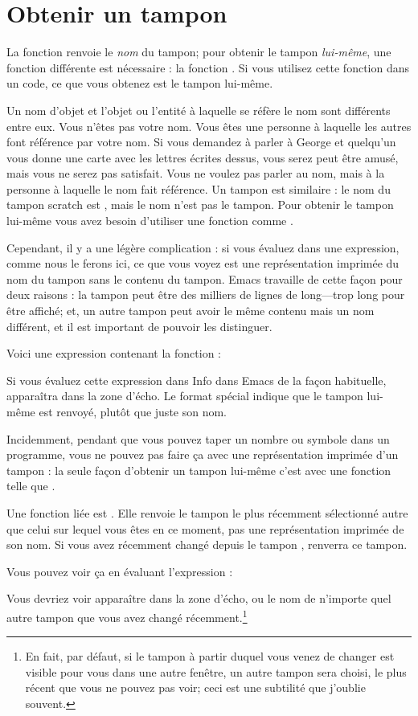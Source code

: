 \section{Obtenir un tampon}

La fonction  renvoie le \textit{nom} du tampon; pour
obtenir le tampon \textit{lui-même}, une fonction différente est
nécessaire : la fonction . Si vous utilisez cette
fonction dans un code, ce que vous obtenez est le tampon lui-même.

Un nom d'objet et l'objet ou l'entité à laquelle se réfère le nom sont
différents entre eux. Vous n'êtes pas votre nom. Vous êtes une
personne à laquelle les autres font référence par votre nom. Si vous
demandez à parler à George et quelqu'un vous donne une carte avec les
lettres  écrites dessus, vous serez
peut être amusé, mais vous ne serez pas satisfait. Vous ne voulez pas
parler au nom, mais à la personne à laquelle le nom fait
référence. Un tampon est similaire : le nom du tampon scratch est
, mais le nom n'est pas le tampon. Pour obtenir le
tampon lui-même vous avez besoin d'utiliser une fonction comme
.

Cependant, il y a une légère complication : si vous évaluez
 dans une expression, comme nous le ferons ici, ce
que vous voyez est une représentation imprimée du nom du tampon sans
le contenu du tampon. Emacs travaille de cette façon pour deux raisons
: la tampon peut être des milliers de lignes de long---trop long pour
être affiché; et, un autre tampon peut avoir le même contenu mais un
nom différent, et il est important de pouvoir les distinguer.

Voici une expression contenant la fonction :


Si vous évaluez cette expression dans Info dans Emacs de la façon
habituelle,  apparaîtra dans la zone d'écho. Le
format spécial indique que le tampon lui-même est renvoyé, plutôt que
juste son nom.

Incidemment, pendant que vous pouvez taper un nombre ou symbole dans
un programme, vous ne pouvez pas faire ça avec une représentation
imprimée d'un tampon : la seule façon d'obtenir un tampon lui-même
c'est avec une fonction telle que .

Une fonction liée est . Elle renvoie le tampon le
plus récemment sélectionné autre que celui sur lequel vous êtes en ce
moment, pas une représentation imprimée de son nom. Si vous avez
récemment changé depuis le tampon , 
renverra ce tampon. 

Vous pouvez voir ça en évaluant l'expression :


Vous devriez voir  apparaître dans la zone
d'écho, ou le nom de n'importe quel autre tampon que vous avez changé
récemment.\footnote{En fait, par défaut, si le tampon à partir duquel
  vous venez de changer est visible pour vous dans une autre fenêtre,
  un autre tampon sera choisi, le plus récent que vous ne pouvez pas
  voir; ceci est une subtilité que j'oublie souvent.}
